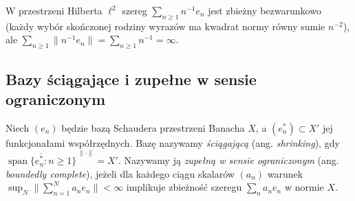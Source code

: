 \begin{przyklad}
\label{ex:not-absolute27}
W przestrzeni Hilberta $\ell^2$ szereg
$\sum_{n\ge1}n^{-1}e_n$ jest zbieżny bezwarunkowo
(każdy wybór skończonej rodziny wyrazów ma kwadrat
normy równy sumie $n^{-2}$), ale
$\sum_{n\ge1}\|n^{-1}e_n\|=\sum_{n\ge1}n^{-1}=\infty$.
\end{przyklad}

\subsection{Bazy ściągające i zupełne w sensie ograniczonym}

\begin{definicja}
\label{def:shrinking-bcomplete27}
Niech $(e_n)$ będzie bazą Schaudera przestrzeni Banacha $X$,
a $(e_n^*)\subset X'$ jej funkcjonałami współrzędnych.
Bazę nazywamy \emph{ściągającą} (ang. \emph{shrinking}), gdy
$\overline{\operatorname{span}\{e_n^*:n\ge1\}}^{\,\|\cdot\|}=X'$.
Nazywamy ją \emph{zupełną w sensie ograniczonym}
(ang. \emph{boundedly complete}), jeżeli dla każdego ciągu
skalarów $(a_n)$ warunek
$\sup_N\|\sum_{n=1}^Na_ne_n\|<\infty$
implikuje zbieżność szeregu $\sum_na_ne_n$ w normie $X$.
\end{definicja}

